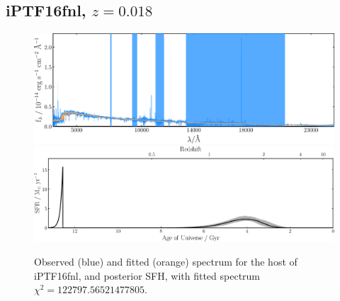\documentclass[a4paper,12pt]{article}
\begin{document}


\newpage
\subsection{iPTF16fnl, $z=0.018$}\label{sec:iPTF16fnl}
\begin{figure}[h]
  \centering
  \includegraphics[width=\textwidth]{iPTF16fnl_spec}
  \includegraphics[width=\textwidth]{iPTF16fnl_sfh}
  \caption{
  Observed (blue) and fitted (orange) spectrum for the host of iPTF16fnl, and
  posterior SFH, with fitted spectrum $\chi^2=122797.56521477805$.
  }
  \label{fig:iPTF16fnl_sfh}
\end{figure}
\end{document}
